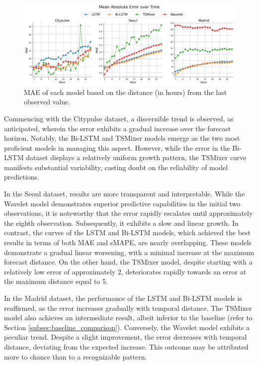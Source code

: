\begin{figure}
    \centering
    \includegraphics[width=1\linewidth]{images/mae_per_hour.png}
    \caption{MAE of each model based on the distance (in hours) from the last observed value.}
    \label{fig:mae-per-hour}
\end{figure}

Commencing with the Citypulse dataset, a discernible trend is observed, as anticipated, wherein the error exhibits a gradual increase over the forecast horizon. Notably, the Bi-LSTM and TSMixer models emerge as the two most proficient models in managing this aspect. However, while the error in the Bi-LSTM dataset displays a relatively uniform growth pattern, the TSMixer curve manifests substantial variability, casting doubt on the reliability of model predictions.

In the Seoul dataset, results are more transparent and interpretable. While the Wavelet model demonstrates superior predictive capabilities in the initial two observations, it is noteworthy that the error rapidly escalates until approximately the eighth observation. Subsequently, it exhibits a slow and linear growth. In contrast, the curves of the LSTM and Bi-LSTM models, which achieved the best results in terms of both MAE and sMAPE, are nearly overlapping. These models demonstrate a gradual linear worsening, with a minimal increase at the maximum forecast distance. On the other hand, the TSMixer model, despite starting with a relatively low error of approximately 2, deteriorates rapidly towards an error at the maximum distance equal to 5.

In the Madrid dataset, the performance of the LSTM and Bi-LSTM models is reaffirmed, as the error increases gradually with temporal distance. The TSMixer model also achieves an intermediate result, albeit inferior to the baseline (refer to Section \ref{subsec:baseline_comparison}). Conversely, the Wavelet model exhibits a peculiar trend. Despite a slight improvement, the error decreases with temporal distance, deviating from the expected increase. This outcome may be attributed more to chance than to a recognizable pattern.\\

